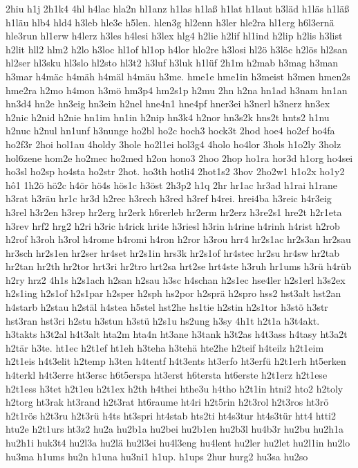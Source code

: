 {2hiu
h1j
2h1k4
4hl
h4lac
hla2n
hl1anz
h1las
h1laß
h1lat
h1laut
h3läd
h1läs
h1läß
h1läu
hlb4
hld4
h3leb
hle3e
h5len.
hlen3g
hl2enn
h3ler
hle2ra
hl1erg
h6l3ernä
hle3run
hl1erw
h4lerz
h3les
h4lesi
h3lex
hlg4
h2lie
h2lif
hl1ind
h2lip
h2lis
h3list
h2lit
hll2
hlm2
h2lo
h3loc
hl1of
hl1op
h4lor
hlo2re
h3losi
hl2ö
h3löc
h2lös
hl2san
hl2ser
hl3sku
hl3slo
hl2sto
hl3t2
h3luf
h3luk
h1lüf
2h1m
h2mab
h3mag
h3man
h3mar
h4mäc
h4mäh
h4mäl
h4mäu
h3me.
hme1e
hme1in
h3meist
h3men
hmen2s
hme2ra
h2mo
h4mon
h3mö
hm3p4
hm2s1p
h2mu
2hn
h2na
hn1ad
h3nam
hn1an
hn3d4
hn2e
hn3eig
hn3ein
h2nel
hne4n1
hne4pf
hner3ei
h3nerl
h3nerz
hn3ex
h2nic
h2nid
h2nie
hn1im
hn1in
h2nip
hn3k4
h2nor
hn3s2k
hns2t
hnts2
h1nu
h2nuc
h2nul
hn1unf
h3nunge
ho2bl
ho2c
hoch3
hock3t
2hod
hoe4
ho2ef
ho4fa
ho2f3r
2hoi
hol1au
4holdy
3hole
ho2l1ei
hol3g4
4holo
ho4lor
3hols
h1o2ly
3holz
hol6zene
hom2e
ho2mec
ho2med
h2on
hono3
2hoo
2hop
ho1ra
hor3d
h1org
ho4sei
ho3sl
ho2sp
ho4sta
ho2str
2hot.
ho3th
hotli4
2hot1s2
3hov
2ho2w1
h1o2x
ho1y2
hô1
1h2ö
hö2c
h4ör
hö4s
hös1c
h3öst
2h3p2
h1q
2hr
hr1ac
hr3ad
h1rai
h1rane
h3rat
h3räu
hr1c
hr3d
h2rec
h3rech
h3red
h3ref
h4rei.
hrei4ba
h3reic
h4r3eig
h3rel
h3r2en
h3rep
hr2erg
hr2erk
h6rerleb
hr2erm
hr2erz
h3re2s1
hre2t
h2r1eta
h3rev
hrf2
hrg2
h2ri
h3ric
h4rick
hri4e
h3riesl
h3rin
h4rine
h4rinh
h4rist
h2rob
h2rof
h3roh
h3rol
h4rome
h4romi
h4ron
h2ror
h3rou
hrr4
hr2s1ac
hr2s3an
hr2sau
hr3sch
hr2s1en
hr2ser
hr4set
hr2s1in
hrs3k
hr2s1of
hr4stec
hr2su
hr4sw
hr2tab
hr2tan
hr2th
hr2tor
hrt3ri
hr2tro
hrt2sa
hrt2se
hrt4ste
h3ruh
hr1ums
h3rü
h4rüb
h2ry
hrz2
4h1s
h2s1ach
h2san
h2sau
h3sc
h4schan
h2s1ec
hse4ler
h2s1erl
h3s2ex
h2s1ing
h2s1of
h2s1par
h2sper
h2sph
hs2por
h2sprä
h2spro
hss2
hst3alt
hst2an
h4starb
h2stau
h2stäl
h4stea
h5stel
hst2he
hs1tie
h2stin
h2s1tor
h3stö
h3str
hst3ran
hst3ri
h2stu
h3stun
h3stü
h2s1u
hs2ung
h3sy
4h1t
h2t1a
h3t4akt.
h3takts
h3t2al
h4t3alt
hta2m
hta4n
ht3ane
h3tank
h3t2as
h4t3ass
h4tasy
ht3a2t
h2tär
h3te.
ht1ec
h2t1ef
ht1eh
h3teha
h3tehä
hte2he
h2teif
h4teilz
h2t1eim
h2t1eis
h4t3elit
h2temp
h3ten
h4tentf
h4t3ents
ht3erfo
ht3erfü
h2t1erh
ht5erken
h4terkl
h4t3erre
ht3ersc
h6t5erspa
ht3erst
h6tersta
ht6erste
h2t1erz
h2t1ese
h2t1ess
h3tet
h2t1eu
h2t1ex
h2th
h4thei
hthe3u
h4tho
h2t1in
htni2
hto2
h2toly
h2torg
ht3rak
ht3rand
h2t3rat
ht6raume
ht4ri
h2t5rin
h2t3rol
h2t3ros
ht3rö
h2t1rös
h2t3ru
h2t3rü
h4ts
ht3spri
ht4stab
hts2ti
ht4s3tur
ht4s3tür
htt4
htti2
htu2e
h2t1urs
ht3z2
hu2a
hu2b1a
hu2bei
hu2b1en
hu2b3l
hu4b3r
hu2bu
hu2h1a
hu2h1i
huk3t4
hu2l3a
hu2lä
hu2l3ei
hu4l3eng
hu4lent
hu2ler
hu2let
hu2l1in
hu2lo
hu3ma
h1ums
hu2n
h1una
hu3ni1
h1up.
h1ups
2hur
hurg2
hu3sa
hu2so
}
